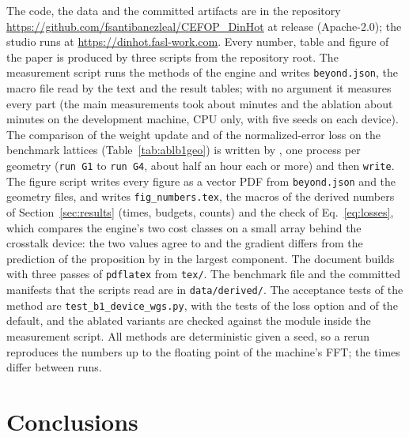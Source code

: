 The code, the data and the committed artifacts are in the repository \url{https://github.com/fsantibanezleal/CEFOP_DinHot} at release \engineRelease{} (Apache-2.0); the studio runs at \url{https://dinhot.fasl-work.com}. Every number, table and figure of the paper is produced by three scripts from the repository root. The measurement script  runs the methods of the engine and writes
\texttt{beyond.json}, the macro file read by the text and the result tables; with no argument it measures every part (the main measurements took about \mainMinutes{} minutes and the ablation about \ablSeconds{} minutes on the development machine, CPU only, with five seeds on each device). The comparison of the weight update and of the normalized-error loss on the benchmark lattices (Table~\ref{tab:ablb1geo}) is written by , one process per geometry (\texttt{run G1} to \texttt{run G4}, about half an hour each or more) and then \texttt{write}. The figure script  writes every figure as a
vector PDF from \texttt{beyond.json} and the geometry files, and writes \texttt{fig\_numbers.tex}, the macros of the derived numbers of Section~\ref{sec:results} (times, budgets, counts) and the check of Eq.~\ref{eq:losses}, which compares the engine's two cost classes on a small array behind the crosstalk device: the two values agree to \lossValueDiff{} and the gradient differs from the prediction of the proposition by \lossGradDiff{} in the largest component. The document builds with three passes of \texttt{pdflatex} from \texttt{tex/}. The benchmark file and the committed manifests that the scripts read are in \texttt{data/derived/}. The acceptance tests of the method are \texttt{test\_b1\_device\_wgs.py}, with the tests of the loss option and of the default, and the ablated variants are checked against the module inside the measurement script. All methods are deterministic given a seed, so a rerun reproduces the numbers up to the floating point of the machine's FFT; the times differ between runs.

\section{Conclusions}\label{sec:conclusions}

